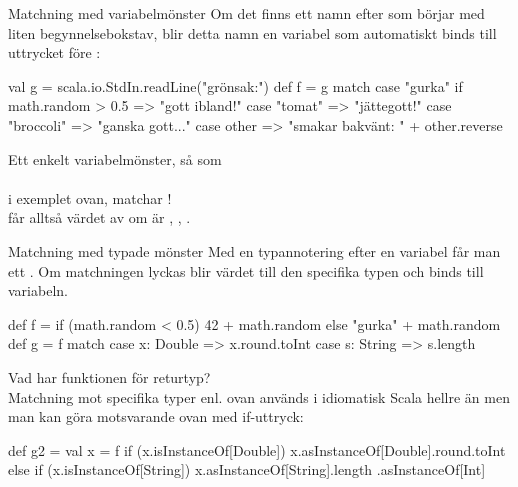 \begin{Slide}{Matchning med variabelmönster}\SlideFontSmall
Om det finns ett namn efter  som börjar med liten begynnelsebokstav, blir detta namn en variabel som automatiskt binds till uttrycket före :

\begin{Code}
val g = scala.io.StdIn.readLine("grönsak:")
def f = g match {
  case "gurka" if math.random > 0.5 => "gott ibland!"
  case "tomat" => "jättegott!"
  case "broccoli" => "ganska gott..."
  case other => "smakar bakvänt: " + other.reverse
}
\end{Code}

Ett enkelt variabelmönster, så som \\  \\ i exemplet ovan, matchar ! \\ får alltså värdet av  om   är , , .  

\end{Slide}





\begin{Slide}{Matchning med typade mönster}\SlideFontSmall
Med en typannotering efter en variabel får man ett  . Om matchningen lyckas blir värdet  till den specifika typen och binds till variabeln.
\begin{Code}
def f = if (math.random < 0.5) 42 + math.random else "gurka" + math.random
def g = f match {
  case x: Double => x.round.toInt
  case s: String => s.length
}
\end{Code}
Vad har funktionen  för returtyp? \\ \pause
Matchning mot specifika typer enl. ovan används i idiomatisk Scala hellre än  men man kan göra motsvarande ovan med if-uttryck:
\begin{Code}
def g2 = {
  val x = f
  if (x.isInstanceOf[Double]) x.asInstanceOf[Double].round.toInt
  else if (x.isInstanceOf[String]) x.asInstanceOf[String].length
}.asInstanceOf[Int]
\end{Code}
\end{Slide}


